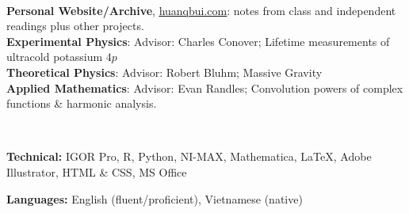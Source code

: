 \documentclass[letter, 10pt]{article}
\newcommand{\longunderline}[1]{\uline{#1\hfill\mbox{}}}
\begin{document}
	\noindent \longunderline{\normalsize{{}}}
	\\ \vspace{-7pt}
	
	\noindent \textbf{Personal Website/Archive}, \href{https://huanqbui.com}{\underline{huanqbui.com}}: notes from class and independent readings plus other projects.\\ %
	\noindent \textbf{Experimental Physics}: Advisor: Charles Conover; Lifetime measurements of ultracold potassium $4p$\\
	\noindent \textbf{Theoretical Physics}: Advisor: Robert Bluhm; Massive Gravity\\
	\noindent \textbf{Applied Mathematics}: Advisor: Evan Randles; Convolution powers of complex functions \& harmonic analysis.\\
	\vspace{-7pt} 
	
		\noindent \longunderline{\normalsize{{}}}
	\\ \vspace{-7pt}
	
	\noindent \textbf{Technical:} IGOR Pro, R, Python,  NI-MAX, Mathematica, \LaTeX{}, Adobe Illustrator, HTML \& CSS, MS Office
	
	\noindent \textbf{Languages:} English (fluent/proficient), Vietnamese (native)\\
	\vspace{-7pt}

	

	
%	

	
\end{document}
